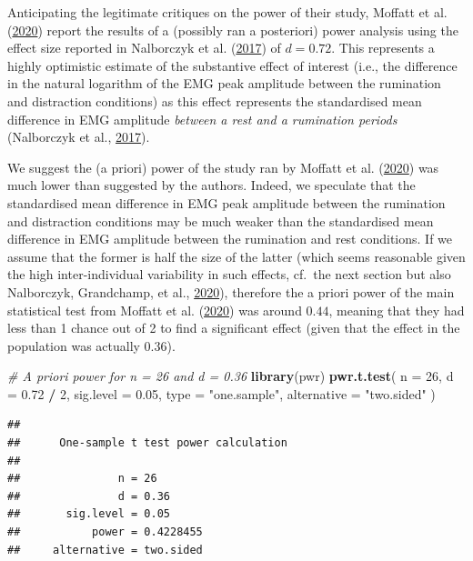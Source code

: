 \documentclass[
  english,
  man, donotrepeattitle,floatsintext]{apa6}
\newenvironment{Shaded}{\begin{snugshade}}{\end{snugshade}}
\newcommand{\CommentTok}[1]{\textcolor[rgb]{0.56,0.35,0.01}{\textit{#1}}}
\newcommand{\DataTypeTok}[1]{\textcolor[rgb]{0.13,0.29,0.53}{#1}}
\newcommand{\DecValTok}[1]{\textcolor[rgb]{0.00,0.00,0.81}{#1}}
\newcommand{\FloatTok}[1]{\textcolor[rgb]{0.00,0.00,0.81}{#1}}
\newcommand{\KeywordTok}[1]{\textcolor[rgb]{0.13,0.29,0.53}{\textbf{#1}}}
\newcommand{\NormalTok}[1]{#1}
\newcommand{\OperatorTok}[1]{\textcolor[rgb]{0.81,0.36,0.00}{\textbf{#1}}}
\newcommand{\StringTok}[1]{\textcolor[rgb]{0.31,0.60,0.02}{#1}}
\begin{document}
Anticipating the legitimate critiques on the power of their study, Moffatt et al. (\protect\hyperlink{ref-moffatt_inner_2020}{2020}) report the results of a (possibly ran a posteriori) power analysis using the effect size reported in Nalborczyk et al. (\protect\hyperlink{ref-nalborczyk_orofacial_2017}{2017}) of \(d = 0.72\). This represents a highly optimistic estimate of the substantive effect of interest (i.e., the difference in the natural logarithm of the EMG peak amplitude between the rumination and distraction conditions) as this effect represents the standardised mean difference in EMG amplitude \emph{between a rest and a rumination periods} (Nalborczyk et al., \protect\hyperlink{ref-nalborczyk_orofacial_2017}{2017}).

We suggest the (a priori) power of the study ran by Moffatt et al. (\protect\hyperlink{ref-moffatt_inner_2020}{2020}) was much lower than suggested by the authors. Indeed, we speculate that the standardised mean difference in EMG peak amplitude between the rumination and distraction conditions may be much weaker than the standardised mean difference in EMG amplitude between the rumination and rest conditions. If we assume that the former is half the size of the latter (which seems reasonable given the high inter-individual variability in such effects, cf.~the next section but also Nalborczyk, Grandchamp, et al., \protect\hyperlink{ref-nalborczyk_can_2020}{2020}), therefore the a priori power of the main statistical test from Moffatt et al. (\protect\hyperlink{ref-moffatt_inner_2020}{2020}) was around \(0.44\), meaning that they had less than 1 chance out of 2 to find a significant effect (given that the effect in the population was actually \(0.36\)).

\begin{Shaded}
\begin{Highlighting}[]
\CommentTok{\# A priori power for n = 26 and d = 0.36}
\KeywordTok{library}\NormalTok{(pwr)}
\KeywordTok{pwr.t.test}\NormalTok{(}
  \DataTypeTok{n =} \DecValTok{26}\NormalTok{, }\DataTypeTok{d =} \FloatTok{0.72} \OperatorTok{/}\StringTok{ }\DecValTok{2}\NormalTok{, }\DataTypeTok{sig.level =} \FloatTok{0.05}\NormalTok{,}
  \DataTypeTok{type =} \StringTok{"one.sample"}\NormalTok{, }\DataTypeTok{alternative =} \StringTok{"two.sided"}
\NormalTok{  )}
\end{Highlighting}
\end{Shaded}

\begin{verbatim}
## 
##      One-sample t test power calculation 
## 
##               n = 26
##               d = 0.36
##       sig.level = 0.05
##           power = 0.4228455
##     alternative = two.sided
\end{verbatim}
\end{document}

